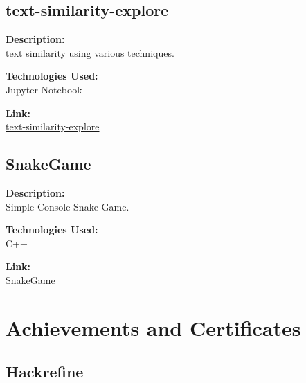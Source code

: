 \documentclass[a4paper,10pt]{article}
\begin{document}
\subsection*{text-similarity-explore}

\noindent
\begin{minipage}[t]{0.4\textwidth}
  \textbf{Description:}\\
  text similarity using various techniques.
\end{minipage}%
\begin{minipage}[t]{0.4\textwidth}
  \textbf{Technologies Used:}\\
  Jupyter Notebook
\end{minipage}%
\begin{minipage}[t]{0.2\textwidth}
  \textbf{Link:}\\
  \href{https://github.com/aditya26062003/text-similarity-explorer}{text-similarity-explore}
\end{minipage}

\subsection*{SnakeGame}

\noindent
\begin{minipage}[t]{0.4\textwidth}
  \textbf{Description:}\\
  Simple Console Snake Game.
\end{minipage}%
\begin{minipage}[t]{0.4\textwidth}
  \textbf{Technologies Used:}\\
  C++
\end{minipage}%
\begin{minipage}[t]{0.2\textwidth}
  \textbf{Link:}\\
  \href{https://github.com/aditya26062003/SnakeGame}{SnakeGame}
\end{minipage}







\section{Achievements and Certificates}

\subsection*{Hackrefine}
\end{document}
